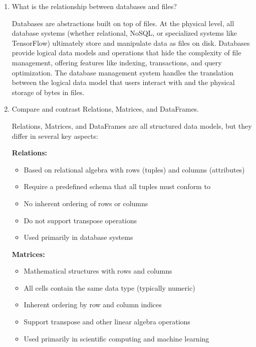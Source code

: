 \documentclass[12pt]{article}
\begin{document}
\begin{enumerate}
    \item What is the relationship between databases and files?
    
    \begin{tcolorbox}[colback=blue!5!white,colframe=blue!75!black,title=Solution]
    Databases are abstractions built on top of files. At the physical level, all database systems (whether relational, NoSQL, or specialized systems like TensorFlow) ultimately store and manipulate data as files on disk. Databases provide logical data models and operations that hide the complexity of file management, offering features like indexing, transactions, and query optimization. The database management system handles the translation between the logical data model that users interact with and the physical storage of bytes in files.
    \end{tcolorbox}
    
    \item Compare and contrast Relations, Matrices, and DataFrames.
    
    \begin{tcolorbox}[colback=blue!5!white,colframe=blue!75!black,title=Solution]
    Relations, Matrices, and DataFrames are all structured data models, but they differ in several key aspects:
    
    \textbf{Relations:}
    \begin{itemize}
        \item Based on relational algebra with rows (tuples) and columns (attributes)
        \item Require a predefined schema that all tuples must conform to
        \item No inherent ordering of rows or columns
        \item Do not support transpose operations
        \item Used primarily in database systems
    \end{itemize}
    
    \textbf{Matrices:}
    \begin{itemize}
        \item Mathematical structures with rows and columns
        \item All cells contain the same data type (typically numeric)
        \item Inherent ordering by row and column indices
        \item Support transpose and other linear algebra operations
        \item Used primarily in scientific computing and machine learning
    \end{itemize}
    

\end{tcolorbox}
\end{enumerate}
\end{document}
